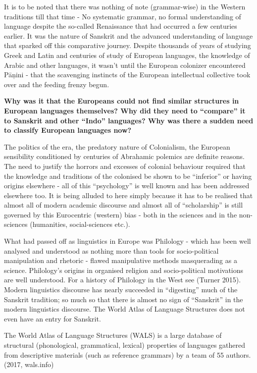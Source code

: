 \vskip 2pt

It is to be noted that there was nothing of note (grammar-wise) in the Western traditions till that time - No systematic grammar, no formal understanding of language despite the so-called Renaissance that had occurred a few centuries earlier. It was the nature of Sanskrit and the advanced understanding of language that sparked off this comparative journey. Despite thousands of years of studying Greek and Latin and centuries of study of European languages, the knowledge of Arabic and other languages, it wasn’t until the European colonizer encountered Pāņini - that the scavenging instincts of the European intellectual collective took over and the feeding frenzy begun.

\vskip 2pt

\textbf{Why was it that the Europeans could not find similar structures in European languages themselves? Why did they need to “compare” it to Sanskrit and other “Indo” languages? Why was there a sudden need to classify European languages now?}

The politics of the era, the predatory nature of Colonialism, the European sensibility conditioned by centuries of Abrahamic polemics are definite reasons. The need to justify the horrors and excesses of colonial behaviour required that the knowledge and traditions of the colonised be shown to be “inferior” or having origins elsewhere - all of this “psychology” is well known and has been addressed elsewhere too. It is being alluded to here simply because it has to be realised that almost all of modern academic discourse and almost all of “scholarship” is still governed by this Eurocentric (western) bias - both in the sciences and in the non-sciences (humanities, social-sciences etc.).

What had passed off as linguistics in Europe was Philology - which has been well analysed and understood as nothing more than tools for socio-political manipulation and rhetoric - flawed manipulative methods masquerading as a science. Philology’s origins in organised religion and socio-political motivations are well understood. For a history of Philology in the West see (Turner 2015). Modern linguistics discourse has nearly succeeded in “digesting” much of the Sanskrit tradition; so much so that there is almost no sign of “Sanskrit” in the modern linguistics discourse. The World Atlas of Language Structures does not even have an entry for Sanskrit.

\begin{myquote}
The World Atlas of Language Structures (WALS) is a large database of structural (phonological, grammatical, lexical) properties of languages gathered from descriptive materials (such as reference grammars) by a team of 55 authors. (2017, wals.info)
\end{myquote}

